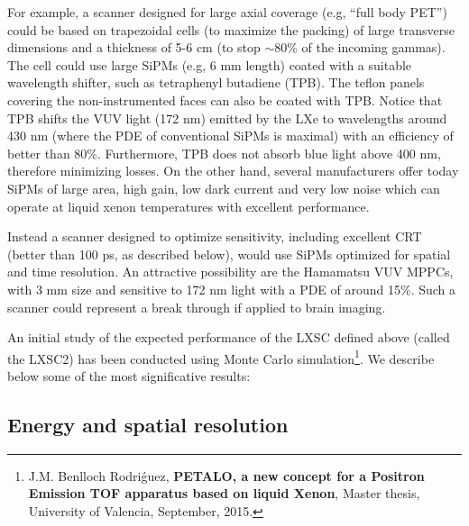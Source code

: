 \documentclass[review]{elsarticle}
\begin{document}
For example, a scanner designed for large axial coverage (e.g, ``full body PET'') could be based on trapezoidal cells (to maximize the packing) of large transverse dimensions and a thickness of 5-6 cm (to stop $\sim$80\% of the incoming gammas). The cell could use large
SiPMs (e.g, 6 mm length) coated with a suitable wavelength shifter, such as tetraphenyl butadiene (TPB). The teflon panels covering the non-instrumented faces can also be coated with TPB. Notice that TPB shifts the VUV light (172 nm) emitted by the LXe  to wavelengths around 430 nm (where the PDE of conventional SiPMs is maximal) with an efficiency of better than 80\%. Furthermore, TPB does not absorb blue light above 400 nm, therefore minimizing losses. On the other hand, several manufacturers offer today SiPMs of large area, high gain, low dark current and very low noise which can operate at liquid xenon temperatures with excellent performance.

Instead a scanner designed to optimize sensitivity, including excellent CRT (better than 100 ps, as described below), would use SiPMs optimized for spatial and time resolution. An attractive possibility are the Hamamatsu VUV MPPCs, with 3 mm size and sensitive to 172 nm light with a PDE of around 15\%. Such a scanner could represent a break through if applied to brain imaging.  

An initial study of the expected performance of the LXSC defined above (called the LXSC2) has been conducted using Monte Carlo simulation\footnote{J.M. Benlloch Rodri\'guez, {\bf PETALO, a new concept for a Positron Emission TOF apparatus based on liquid Xenon}, Master thesis, University of Valencia, September, 2015.}. We describe below some of the most significative results:

\subsection{Energy and spatial resolution}
\end{document}
